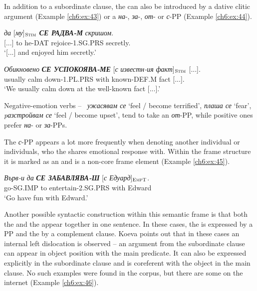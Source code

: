 \documentclass[output=paper,colorlinks,citecolor=brown]{langscibook}
\begin{document}
In addition to a subordinate clause, the  can also be introduced by a dative clitic argument (Example \ref{ch6:ex:43}) or a \textit{на}-, \textit{за}-, \textit{от}- or \textit{с}-PP (Example \ref{ch6:ex:44}).

\begin{exe} 
\ex  \label{ch6:ex:43} 
\gll [...] \textit{да} [\textit{му}]$_{\text{\textsc{Stim}}}$ \textit{\textbf{СЕ РАДВА-М}}   \textit{скришом}.\\ 
{}[...] {to} {he-DAT} {rejoice-1.SG.PRS} {secretly}.
\\ %
\glt `[...] and enjoyed him secretly.'

\ex \label{ch6:ex:44} 
\gll \textit{Обикновено} \textit{\textbf{СЕ УСПОКОЯВА-МЕ}} [\textit{с} \textit{известн-ия} \textit{факт}]$_{\text{\textsc{Stim}}}$ [...].\\ 
{usually} {calm down-1.PL.PRS} {with} {known-DEF.M} {fact} [...].
\\ %
\glt `We usually calm down at the well-known fact [...].'
\end{exe}

Negative-emotion verbs --~ \textit{ужасявам се} `feel / become terrified', \textit{плаша се} `fear', \textit{pазстройвам се} `feel / become upset', tend to take an \textit{от}-PP, while positive ones prefer \textit{на}- or \textit{за}-PPs. 



The \textit{с}-PP appears a lot more frequently when denoting another individual or individuals, who the  shares emotional response with. Within the frame structure it is marked as an  and is a non-core frame element (Example \ref{ch6:ex:45}). 


\begin{exe} 
\ex   \label{ch6:ex:45}
\gll \textit{Върв-и} \textit{да} \textit{\textbf{СЕ ЗАБАВЛЯВА-Ш}} [\textit{с} \textit{Едуард}]$_{\text{\textsc{EmpT}}}$.\\ 
{go-SG.IMP} {to} {entertain-2.SG.PRS} {with} {Edward}
\\ %
\glt `Go have fun with Edward.'
\end{exe}


Another possible syntactic construction within this semantic frame is that both the  and the  appear together in one sentence. In these cases, the  is expressed by a PP and the  by a complement clause. Koeva points out that in these cases an internal left dislocation is observed -- an argument from the subordinate clause can appear in object position with the main predicate. It can also be expressed explicitly in the subordinate clause and is coreferent with the object in the main clause. No such examples were found in the corpus, but there are some on the internet (Example \ref{ch6:ex:46}).
\end{document}
